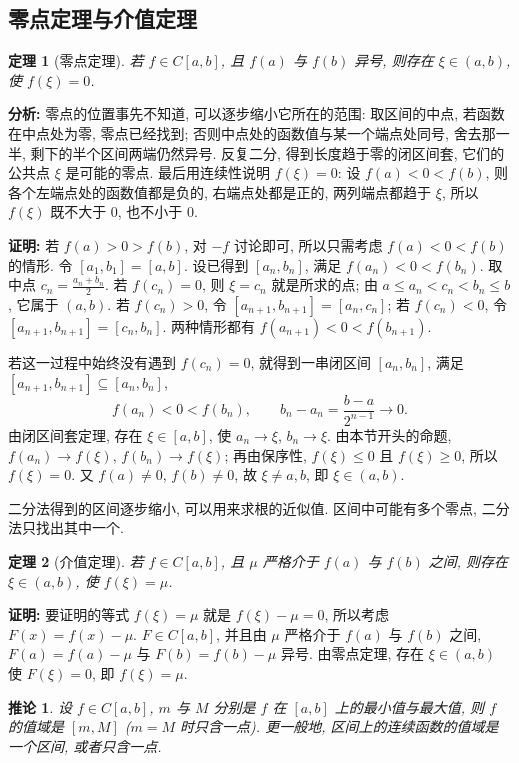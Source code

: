 \documentclass[UTF8,openany]{ctexbook}
\theoremstyle{chinesetextbook}
\newtheorem{theorem}{定理}[section]
\newenvironment{cnproof}{\par\indent\textbf{证明:} \ignorespaces}{\par}
\newtheorem*{corollarysingle}{推论}
\begin{document}
\subsection{零点定理与介值定理}
\begin{theorem}[零点定理]
若 $f\in C[a,b]$, 且 $f(a)$ 与 $f(b)$ 异号, 则存在 $\xi\in(a,b)$, 使 $f(\xi)=0$.
\end{theorem}
\par\indent\textbf{分析:} 零点的位置事先不知道, 可以逐步缩小它所在的范围: 取区间的中点, 若函数在中点处为零, 零点已经找到; 否则中点处的函数值与某一个端点处同号, 舍去那一半, 剩下的半个区间两端仍然异号. 反复二分, 得到长度趋于零的闭区间套, 它们的公共点 $\xi$ 是可能的零点. 最后用连续性说明 $f(\xi)=0$: 设 $f(a)<0<f(b)$, 则各个左端点处的函数值都是负的, 右端点处都是正的, 两列端点都趋于 $\xi$, 所以 $f(\xi)$ 既不大于 $0$, 也不小于 $0$.
\begin{cnproof}
若 $f(a)>0>f(b)$, 对 $-f$ 讨论即可, 所以只需考虑 $f(a)<0<f(b)$ 的情形. 令 $[a_1,b_1]=[a,b]$. 设已得到 $[a_n,b_n]$, 满足 $f(a_n)<0<f(b_n)$. 取中点 $\displaystyle c_n=\frac{a_n+b_n}2$. 若 $f(c_n)=0$, 则 $\xi=c_n$ 就是所求的点; 由 $a\le a_n<c_n<b_n\le b$, 它属于 $(a,b)$. 若 $f(c_n)>0$, 令 $[a_{n+1},b_{n+1}]=[a_n,c_n]$; 若 $f(c_n)<0$, 令 $[a_{n+1},b_{n+1}]=[c_n,b_n]$. 两种情形都有 $f(a_{n+1})<0<f(b_{n+1})$.

若这一过程中始终没有遇到 $f(c_n)=0$, 就得到一串闭区间 $[a_n,b_n]$, 满足 $[a_{n+1},b_{n+1}]\subseteq[a_n,b_n]$,
\[
f(a_n)<0<f(b_n),\qquad b_n-a_n=\frac{b-a}{2^{n-1}}\to0.
\]
由闭区间套定理, 存在 $\xi\in[a,b]$, 使 $a_n\to\xi$, $b_n\to\xi$. 由本节开头的命题, $f(a_n)\to f(\xi)$, $f(b_n)\to f(\xi)$; 再由保序性, $f(\xi)\le0$ 且 $f(\xi)\ge0$, 所以 $f(\xi)=0$. 又 $f(a)\ne0$, $f(b)\ne0$, 故 $\xi\ne a,b$, 即 $\xi\in(a,b)$.
\end{cnproof}
二分法得到的区间逐步缩小, 可以用来求根的近似值. 区间中可能有多个零点, 二分法只找出其中一个.
\begin{theorem}[介值定理]
若 $f\in C[a,b]$, 且 $\mu$ 严格介于 $f(a)$ 与 $f(b)$ 之间, 则存在 $\xi\in(a,b)$, 使 $f(\xi)=\mu$.
\end{theorem}
\begin{cnproof}
要证明的等式 $f(\xi)=\mu$ 就是 $f(\xi)-\mu=0$, 所以考虑 $F(x)=f(x)-\mu$. $F\in C[a,b]$, 并且由 $\mu$ 严格介于 $f(a)$ 与 $f(b)$ 之间, $F(a)=f(a)-\mu$ 与 $F(b)=f(b)-\mu$ 异号. 由零点定理, 存在 $\xi\in(a,b)$ 使 $F(\xi)=0$, 即 $f(\xi)=\mu$.
\end{cnproof}
\begin{corollarysingle}
设 $f\in C[a,b]$, $m$ 与 $M$ 分别是 $f$ 在 $[a,b]$ 上的最小值与最大值, 则 $f$ 的值域是 $[m,M]$ ($m=M$ 时只含一点). 更一般地, 区间上的连续函数的值域是一个区间, 或者只含一点.
\end{corollarysingle}
\end{document}
